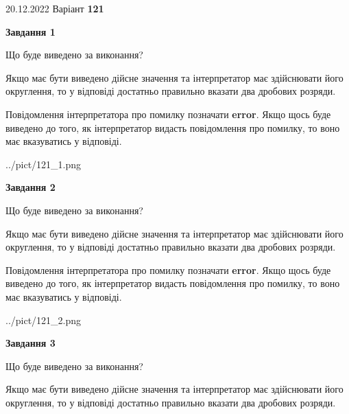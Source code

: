 \documentclass[12pt, ukrainian]{article}
\begin{document}
{20.12.2022 Варіант \No \textbf { 121 }\par}
{
\begin {Large}

{\begin {center}\textbf{Завдання 1}\end {center}}\par
Що буде виведено за виконання? \par

Якщо має бути виведено дійсне значення та інтерпретатор має здійснювати його округлення, 
то у відповіді достатньо правильно вказати два дробових розряди.

Повідомлення інтерпретатора про помилку позначати \textbf{error}.
Якщо щось буде виведено до того, як інтерпретатор видасть повідомлення про помилку, 
то воно має вказуватись у відповіді. \par

\begin{center}
	{../pict/121_1.png}
\end{center}
\newpage

{\begin {center}\textbf{Завдання 2}\end {center}}\par
Що буде виведено за виконання? \par

Якщо має бути виведено дійсне значення та інтерпретатор має здійснювати його округлення, 
то у відповіді достатньо правильно вказати два дробових розряди.

Повідомлення інтерпретатора про помилку позначати \textbf{error}.
Якщо щось буде виведено до того, як інтерпретатор видасть повідомлення про помилку, 
то воно має вказуватись у відповіді. \par

\begin{center}
	{../pict/121_2.png}
\end{center}
\newpage

{\begin {center}\textbf{Завдання 3}\end {center}}\par
Що буде виведено за виконання? \par

Якщо має бути виведено дійсне значення та інтерпретатор має здійснювати його округлення, 
то у відповіді достатньо правильно вказати два дробових розряди.


\end{Large}}
\end{document}
